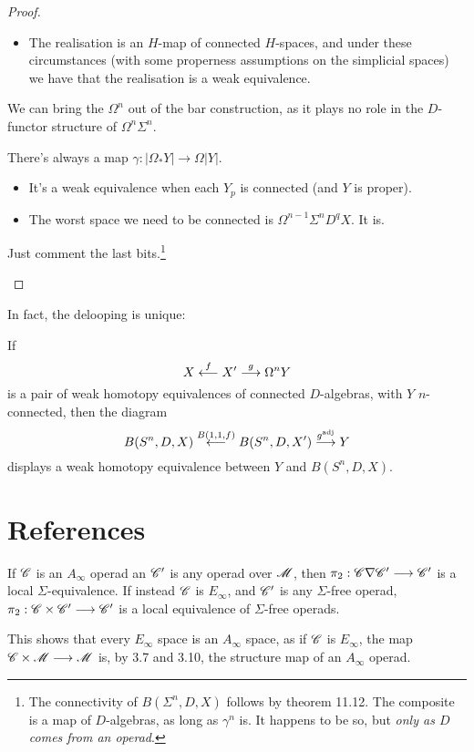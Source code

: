 \documentclass[11pt]{article}
\begin{document}
\begin{Operads}
\begin{proof}
\begin{itemise}
\begin{itemize}
\item The realisation is an $H$-map of connected $H$-spaces, and under these circumstances (with some properness assumptions on the simplicial spaces) we have that the realisation is a weak equivalence.
\end{itemize}
\item We can bring the $\Omega^n$ out of the bar construction, as it plays no role in the $D$-functor structure of $\Omega^n\Sigma^n$.
\item There's always a map $\gamma:|\Omega_*Y|\to\Omega|Y|$.
\begin{itemize}\squishlist
\item It's a weak equivalence when each $Y_p$ is connected (and $Y$ is proper).
\item The worst space we need to be connected is $\Omega^{n-1}\Sigma^nD^qX$. It is.
\end{itemize}
\item Just comment the last bits.\footnote{The connectivity of $B(\Sigma^n,D,X)$ follows by theorem 11.12. The composite is a map of $D$-algebras, as long as $\gamma^n$ is. It happens to be so, but \emph{only as $D$ comes from an operad}.}\qedhere
\end{itemise}
\end{proof}
In fact, the delooping is unique:
\begin{cor*}
If
\[X\overset{f}{\longleftarrow}X'\overset{g}{\longrightarrow}\Omega^nY\]
 is a pair of weak homotopy equivalences of connected $D$-algebras, with $Y$ $n$-connected, then the diagram
\[B(S^n,D,X)\overset{B(1,1,f)}{\longleftarrow}B(S^n,D,X')\overset{g^{\textup{adj}}}{\longrightarrow}Y\]
displays a weak homotopy equivalence between $Y$ and $B(S^n,D,X)$.
\end{cor*}

\pagebreak
\section*{References}
\begin{prop*}[3.10]
If $\mathscr{C}$ is an $A_\infty$ operad an $\mathscr{C}'$ is any operad over $\mathscr{M}$, then
$\pi_2:\mathscr{C}\nabla\mathscr{C}'\longrightarrow\mathscr{C}'$ is a local $\Sigma$-equivalence. If instead
$\mathscr{C}$ is $E_\infty$, and $\mathscr{C}'$ is any $\Sigma$-free operad,
$\pi_2:\mathscr{C}\times\mathscr{C}'\longrightarrow\mathscr{C}'$ is a local equivalence of $\Sigma$-free
operads.
\end{prop*}\noindent
This shows that every $E_\infty$ space is an $A_\infty$ space, as if $\mathscr{C}$
is $E_\infty$, the map $\mathscr{C}\times\mathscr{M}\longrightarrow\mathscr{M}$ is, by 3.7 and 3.10,
the structure map of an $A_\infty$ operad. 


\end{Operads}
\end{document}
